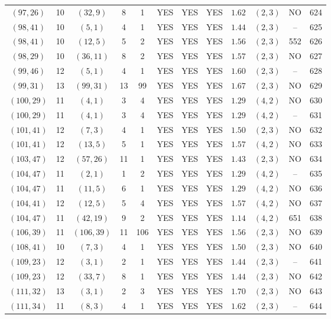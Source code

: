 \begin{longtable}{|c|c|c|c|c|c|c|c|c|c|c|c|}
$(97,26)$ & 10 & $(32,9)$ & 8 & 1 & YES & YES & YES & $1.62$ & $(2,3)$ & NO & 624\\
$(98,41)$ & 10 & $(5,1)$ & 4 & 1 & YES & YES & YES & $1.44$ & $(2,3)$ & -- & 625\\
$(98,41)$ & 10 & $(12,5)$ & 5 & 2 & YES & YES & YES & $1.56$ & $(2,3)$ & 552 & 626\\
$(98,29)$ & 10 & $(36,11)$ & 8 & 2 & YES & YES & YES & $1.57$ & $(2,3)$ & NO & 627\\
$(99,46)$ & 12 & $(5,1)$ & 4 & 1 & YES & YES & YES & $1.60$ & $(2,3)$ & -- & 628\\
$(99,31)$ & 13 & $(99,31)$ & 13 & 99 & YES & YES & YES & $1.67$ & $(2,3)$ & NO & 629\\
$(100,29)$ & 11 & $(4,1)$ & 3 & 4 & YES & YES & YES & $1.29$ & $(4,2)$ & NO & 630\\
$(100,29)$ & 11 & $(4,1)$ & 3 & 4 & YES & YES & YES & $1.29$ & $(4,2)$ & -- & 631\\
$(101,41)$ & 12 & $(7,3)$ & 4 & 1 & YES & YES & YES & $1.50$ & $(2,3)$ & NO & 632\\
$(101,41)$ & 12 & $(13,5)$ & 5 & 1 & YES & YES & YES & $1.57$ & $(4,2)$ & NO & 633\\
$(103,47)$ & 12 & $(57,26)$ & 11 & 1 & YES & YES & YES & $1.43$ & $(2,3)$ & NO & 634\\
$(104,47)$ & 11 & $(2,1)$ & 1 & 2 & YES & YES & YES & $1.29$ & $(4,2)$ & -- & 635\\
$(104,47)$ & 11 & $(11,5)$ & 6 & 1 & YES & YES & YES & $1.29$ & $(4,2)$ & NO & 636\\
$(104,41)$ & 12 & $(12,5)$ & 5 & 4 & YES & YES & YES & $1.57$ & $(4,2)$ & NO & 637\\
$(104,47)$ & 11 & $(42,19)$ & 9 & 2 & YES & YES & YES & $1.14$ & $(4,2)$ & 651 & 638\\
$(106,39)$ & 11 & $(106,39)$ & 11 & 106 & YES & YES & YES & $1.56$ & $(2,3)$ & NO & 639\\
$(108,41)$ & 10 & $(7,3)$ & 4 & 1 & YES & YES & YES & $1.50$ & $(2,3)$ & NO & 640\\
$(109,23)$ & 12 & $(3,1)$ & 2 & 1 & YES & YES & YES & $1.44$ & $(2,3)$ & -- & 641\\
$(109,23)$ & 12 & $(33,7)$ & 8 & 1 & YES & YES & YES & $1.44$ & $(2,3)$ & NO & 642\\
$(111,32)$ & 13 & $(3,1)$ & 2 & 3 & YES & YES & YES & $1.70$ & $(2,3)$ & NO & 643\\
$(111,34)$ & 11 & $(8,3)$ & 4 & 1 & YES & YES & YES & $1.62$ & $(2,3)$ & -- & 644\\

\end{longtable}
